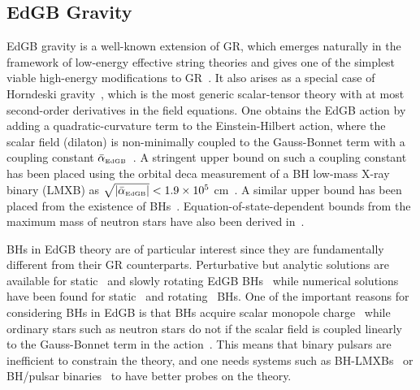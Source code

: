 \documentclass[prd,twocolumn,nofootinbib]{revtex4-1}
\newcommand{\EDGB}{{\mbox{\tiny EdGB}}}
\begin{document}
  \subsection{EdGB Gravity}
EdGB gravity is a well-known extension of GR, which emerges naturally in the framework of low-energy effective string theories  and gives one of the simplest viable high-energy modifications to GR~\cite{Moura:2006pz,Pani:2009wy}. It also arises as a special case of Horndeski gravity~\cite{Zhang:2017unx,Berti:2015itd}, which is the most generic scalar-tensor theory with at most second-order derivatives in the field equations. One obtains the EdGB action by adding a quadratic-curvature term to the Einstein-Hilbert action, where the scalar field (dilaton) is non-minimally coupled to the Gauss-Bonnet term with a coupling constant $\bar{\alpha}_\EDGB$~\cite{Kanti:1995vq}. A stringent upper bound on such a coupling constant has been placed using the orbital deca measurement of a BH low-mass X-ray binary (LMXB) as $\sqrt{|\bar{\alpha}_\EDGB|} < 1.9\times10^5$ cm~\cite{Yagi:2012gp}. A similar upper bound has been placed from the existence of BHs~\cite{Pani:2009wy}. Equation-of-state-dependent bounds from the maximum mass of neutron stars have also been derived in~\cite{pani-EDGB-NS}. 


BHs in EdGB theory are of particular interest since they are fundamentally different from their GR counterparts. Perturbative but analytic solutions are available for static~\cite{Mignemi:1992nt,Mignemi:1993ce,Yunes:2011we,Sotiriou:2014pfa} and slowly rotating EdGB BHs~\cite{Pani:2011gy,Ayzenberg:2014aka,Maselli:2015tta} while numerical solutions have been found for static~\cite{Kanti:1995vq,Torii:1996yi,Alexeev:1996vs} and rotating~\cite{Pani:2009wy,Kleihaus:2011tg,Kleihaus:2014lba} BHs. One of the important reasons for considering BHs in EdGB is that BHs acquire scalar monopole charge~\cite{Yagi:2011xp,Sotiriou:2014pfa,Berti:2018cxi,Prabhu:2018aun} while ordinary stars such as neutron stars do not if the scalar field is coupled linearly to the Gauss-Bonnet term in the action~\cite{Yagi:2011xp,Yagi:2015oca}. This means that binary pulsars are inefficient to constrain the theory, and one needs systems such as BH-LMXBs~\cite{Yagi:2012gp} or BH/pulsar binaries~\cite{Yagi:2015oca} to have better probes on the theory.
\end{document}
